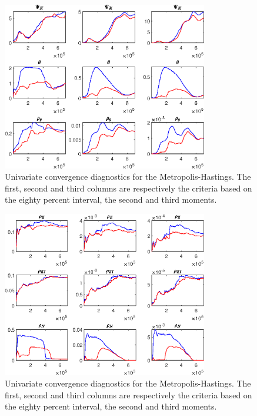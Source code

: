 \begin{figure}[H]
\centering 
\includegraphics[width=0.80\textwidth]{BRS_sectoral/Output/BRS_sectoral_udiag7}
\caption{Univariate convergence diagnostics for the Metropolis-Hastings.
The first, second and third columns are respectively the criteria based on
the eighty percent interval, the second and third moments.}\label{Fig:UnivariateDiagnostics:7}
\end{figure}

\begin{figure}[H]
\centering 
\includegraphics[width=0.80\textwidth]{BRS_sectoral/Output/BRS_sectoral_udiag8}
\caption{Univariate convergence diagnostics for the Metropolis-Hastings.
The first, second and third columns are respectively the criteria based on
the eighty percent interval, the second and third moments.}\label{Fig:UnivariateDiagnostics:8}
\end{figure}

